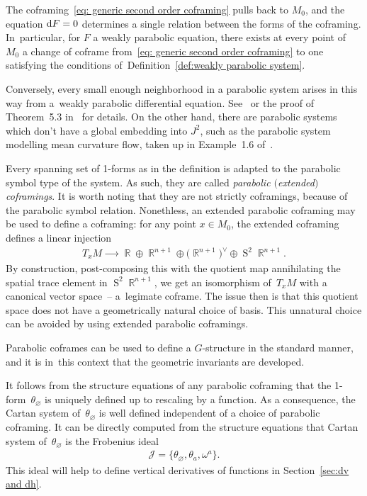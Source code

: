 \documentclass[pdftex]{sigma}
\DeclareMathOperator{\R}{\mathbb{R}}
\DeclareMathOperator{\Sym}{S}
\renewcommand{\d}{{\rm d}}
\newcommand{\thetas}[1]{\theta_{#1}}
\newcommand{\cartTheta}{\mathcal{J}}
\newcommand{\jets}{J^2}
\numberwithin{equation}{section}
\begin{document}
\begin{Remark}
 The coframing~\eqref{eq: generic second order coframing} pulls back to $ M_0 $, and the equation $ \d F = 0 $ determines a single relation between the forms of the coframing.
 In~particular, for $ F $ a weakly parabolic equation, there exists at every point of~$ M_0 $ a change of coframe from~\eqref{eq: generic second order coframing} to one satisfying the conditions of~Definition~\ref{def:weakly parabolic system}.

 Conversely, every small enough neighborhood in a parabolic system arises in this way from a~weakly parabolic differential equation.
 See~\cite[Theorem~5.10]{BCGGG} or the proof of Theorem~5.3 in~\cite{McMillan:ParabolicsI} for details.
 On the other hand, there are parabolic systems which don't have a global embedding into $\jets$, such as the parabolic system modelling mean curvature flow, taken up in Example~1.6 of~\cite{McMillan:ParabolicsI}.
\end{Remark}

\begin{Remark}\label{rmk: parabolic G structure}
 Every spanning set of 1-forms as in the definition is adapted to the parabolic symbol type of the system. As such, they are called \emph{parabolic $($extended$)$ coframings}. It is worth noting that they are not strictly coframings, because of the parabolic symbol relation. Nonethless, an extended parabolic coframing may be used to define a coframing: for any point $x \in M_0$, the extended coframing defines a linear injection
 \begin{gather*}
 T_xM \xrightarrow{\qquad} \R \oplus \R^{n+1} \oplus \big(\R^{n+1}\big)^\vee \oplus \Sym^2\R^{n+1} .
 \end{gather*}
 By construction, post-composing this with the quotient map annihilating the spatial trace element in $\Sym^2 \R^{n+1}$, we get an isomorphism of~$T_xM$ with a canonical vector space~-- a~legimate coframe. The issue then is that this quotient space does not have a geometrically natural choice of basis. This unnatural choice can be avoided by using extended parabolic coframings.

 Parabolic coframes can be used to define a $G$-structure in the standard manner, and it is in~this context that the geometric invariants are developed.
\end{Remark}

\begin{Remark}\label{rmk: Cartan system}
 It follows from the structure equations of any parabolic coframing that the 1-form~$\thetas{\varnothing}$ is uniquely defined up to rescaling by a function. As a consequence, the Cartan system of~$\thetas{\varnothing}$ is well defined independent of a choice of parabolic coframing. It can be directly computed from the structure equations that Cartan system of~$\thetas{\varnothing}$ is the Frobenius ideal
 \begin{gather*}
 \cartTheta = \{ \thetas{\varnothing}, \thetas{a}, \omega^a \} .
 \end{gather*}
 This ideal will help to define vertical derivatives of functions in Section~\ref{sec:dv and dh}.
\end{Remark}
\end{document}
